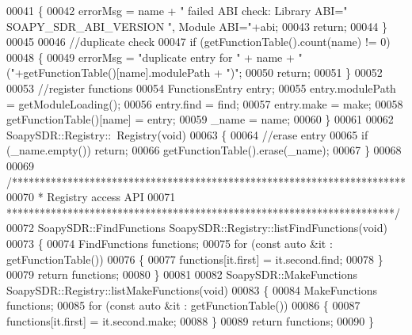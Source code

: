 \begin{DoxyCode}
00041     \{
00042         errorMsg = name + \textcolor{stringliteral}{" failed ABI check: Library ABI="} 
      SOAPY_SDR_ABI_VERSION \textcolor{stringliteral}{", Module ABI="}+abi;
00043         \textcolor{keywordflow}{return};
00044     \}
00045 
00046     \textcolor{comment}{//duplicate check}
00047     \textcolor{keywordflow}{if} (getFunctionTable().count(name) != 0)
00048     \{
00049         errorMsg = \textcolor{stringliteral}{"duplicate entry for "} + name + \textcolor{stringliteral}{" ("}+getFunctionTable()[name].modulePath + \textcolor{stringliteral}{")"};
00050         \textcolor{keywordflow}{return};
00051     \}
00052 
00053     \textcolor{comment}{//register functions}
00054     FunctionsEntry entry;
00055     entry.modulePath = getModuleLoading();
00056     entry.find = find;
00057     entry.make = make;
00058     getFunctionTable()[name] = entry;
00059     \_name = name;
00060 \}
00061 
00062 SoapySDR::Registry::~Registry(\textcolor{keywordtype}{void})
00063 \{
00064     \textcolor{comment}{//erase entry}
00065     \textcolor{keywordflow}{if} (\_name.empty()) \textcolor{keywordflow}{return};
00066     getFunctionTable().erase(\_name);
00067 \}
00068 
00069 \textcolor{comment}{/***********************************************************************}
00070 \textcolor{comment}{ * Registry access API}
00071 \textcolor{comment}{ **********************************************************************/}
00072 SoapySDR::FindFunctions SoapySDR::Registry::listFindFunctions(\textcolor{keywordtype}{void})
00073 \{
00074     FindFunctions functions;
00075     \textcolor{keywordflow}{for} (\textcolor{keyword}{const} \textcolor{keyword}{auto} &it : getFunctionTable())
00076     \{
00077         functions[it.first] = it.second.find;
00078     \}
00079     \textcolor{keywordflow}{return} functions;
00080 \}
00081 
00082 SoapySDR::MakeFunctions SoapySDR::Registry::listMakeFunctions(\textcolor{keywordtype}{void})
00083 \{
00084     MakeFunctions functions;
00085     \textcolor{keywordflow}{for} (\textcolor{keyword}{const} \textcolor{keyword}{auto} &it : getFunctionTable())
00086     \{
00087         functions[it.first] = it.second.make;
00088     \}
00089     \textcolor{keywordflow}{return} functions;
00090 \}
\end{DoxyCode}
